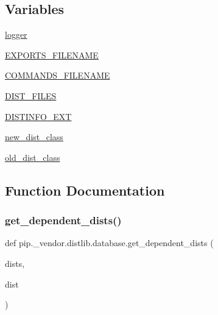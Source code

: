 \subsection*{Variables}
\begin{DoxyCompactItemize}
\item 
\hyperlink{namespacepip_1_1__vendor_1_1distlib_1_1database_af347bcfaf4f42a2c197872ae66160fc7}{logger}
\item 
\hyperlink{namespacepip_1_1__vendor_1_1distlib_1_1database_a5d2e542360c1aa05cd9fc46d72b4bfec}{E\+X\+P\+O\+R\+T\+S\+\_\+\+F\+I\+L\+E\+N\+A\+ME}
\item 
\hyperlink{namespacepip_1_1__vendor_1_1distlib_1_1database_a5f2dd43a7bbc0b02722962070a231b11}{C\+O\+M\+M\+A\+N\+D\+S\+\_\+\+F\+I\+L\+E\+N\+A\+ME}
\item 
\hyperlink{namespacepip_1_1__vendor_1_1distlib_1_1database_a615737510a68a582f3bf83dc1f0d97d5}{D\+I\+S\+T\+\_\+\+F\+I\+L\+ES}
\item 
\hyperlink{namespacepip_1_1__vendor_1_1distlib_1_1database_a88d674ca816bece6cec0b36a6f084489}{D\+I\+S\+T\+I\+N\+F\+O\+\_\+\+E\+XT}
\item 
\hyperlink{namespacepip_1_1__vendor_1_1distlib_1_1database_a51e6e974a0aea8f0ab182ac829c83565}{new\+\_\+dist\+\_\+class}
\item 
\hyperlink{namespacepip_1_1__vendor_1_1distlib_1_1database_a19b01881e214d52e16534949d8ee9002}{old\+\_\+dist\+\_\+class}
\end{DoxyCompactItemize}


\subsection{Function Documentation}
\mbox{\label{namespacepip_1_1__vendor_1_1distlib_1_1database_a8f519f4fa277d7754db81c4e7310c96f}} 
\subsubsection{\texorpdfstring{get\+\_\+dependent\+\_\+dists()}{get\_dependent\_dists()}}
{\footnotesize\ttfamily def pip.\+\_\+vendor.\+distlib.\+database.\+get\+\_\+dependent\+\_\+dists (\begin{DoxyParamCaption}\item[{}]{dists,  }\item[{}]{dist }\end{DoxyParamCaption})}


